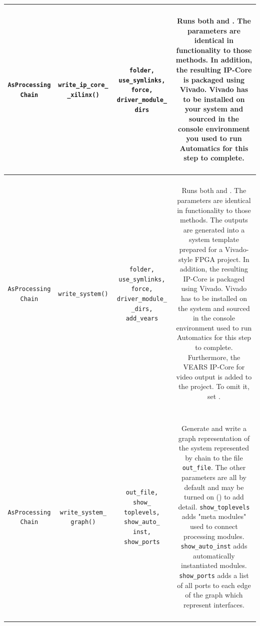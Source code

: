 \begin{longtable}[htbp]{|c|c|c|c|}
\hline
\parbox{2.5cm}{~\\ \texttt{AsProcessing Chain}\\~} & \parbox{3cm}{~\\ \texttt{write\_ip\_core\_\\ \_xilinx()}\\~} & \parbox{3cm}{~ \\ \texttt{folder, use\_symlinks, force, driver\_module\_ dirs} \\ ~} & \parbox{6cm}{~\\ Runs both  and . The parameters are identical in functionality to those methods. In addition, the resulting IP-Core is packaged using Vivado. Vivado has to be installed on your system and sourced in the console environment you used to run Automatics for this step to complete. \\~}\\
\hline
\parbox{2.5cm}{~\\ \texttt{AsProcessing Chain}\\~} & \parbox{3cm}{~\\ \texttt{write\_system()}\\~} & \parbox{3cm}{~ \\ \texttt{folder, use\_symlinks, force, driver\_module\_\\\_dirs, add\_vears} \\ ~} & \parbox{6cm}{~\\ Runs both  and . The parameters are identical in functionality to those methods.
The outputs are generated into a system template prepared for a Vivado-style FPGA project. In addition, the resulting IP-Core is packaged using Vivado. Vivado has to be installed on the system and sourced in the console environment used to run Automatics for this step to complete. Furthermore, the VEARS IP-Core for video output is added to the project. To omit it, set . \\~}\\
\hline
\parbox{2.5cm}{~\\ \texttt{AsProcessing Chain}\\~} & \parbox{3cm}{~\\ \texttt{write\_system\_ graph()}\\~} & \parbox{3cm}{~ \\ \texttt{out\_file, show\_ toplevels, show\_auto\_ inst, show\_ports} \\ ~} & \parbox{6cm}{~\\ Generate and write a graph representation of the system represented by chain to the file \texttt{out\_file}. The other parameters are all  by default and may be turned on () to add detail. \texttt{show\_toplevels} adds "meta modules" used to connect  processing modules. \texttt{show\_auto\_inst} adds automatically instantiated modules. \texttt{show\_ports} adds a list of all ports to each edge of the graph which represent interfaces. \\~}\\

\end{longtable}
